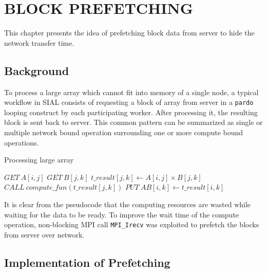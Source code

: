 \chapter{BLOCK PREFETCHING}\label{block prefetching}

This chapter presents the idea of prefetching block data from server to hide the
network transfer time.

\section{Background}\label{prefetchingbackground}
To process a large array which cannot fit into memory of a single node, a typical
workflow in SIAL consists of requesting a block of array from server in a
\texttt{pardo} looping construct by each participating worker. After processing
it, the resulting block is sent back to server. This common pattern can be
summarized as single or multiple network bound operation surrounding one or more
compute bound operations.

\begin{algorithm}  {Processing large array}
\singlespacing

\begin{algorithmic}[1]\label{alg:SIALWorkFLow}
\Loop{}
\State $GET\ A[i, j]$
\State $GET\ B[j, k]$
\State $t\_result[j, k] \gets A[i, j] \times B[j, k]$
\State $CALL\ compute\_fun(t\_result[j, k])$
\State $PUT\ AB[i, k] \gets t\_result[i, k]$
\EndLoop
\end{algorithmic}
\end{algorithm}

It is clear from the pseudocode that the computing resources are wasted while
waiting for the data to be ready. To improve the wait time of the compute
operation, non-blocking MPI call \texttt{MPI\_Irecv} was exploited to prefetch
the blocks from server over network.

\section{Implementation of Prefetching}

